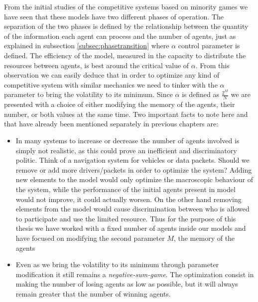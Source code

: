 From the initial studies of the competitive systems based on minority games we have seen that these models have two different phases of operation.
The separation of the two phases is defined by the relationship between the quantity of the information each agent can process and the number of agents, just as explained in subsection \ref{subsec:phasetransition} where $\alpha$ control parameter is defined.
The efficiency of the model, measured in the capacity to distribute the resources between agents, is best around the critical value of $\alpha$.
From this observation we can easily deduce that in order to optimize any kind of competitive system with similar mechanics we need to tinker with the $\alpha$ parameter to bring the volatility to its minimum.
Since $\alpha$ is defined as $\frac{2^M}{N}$ we are presented with a choice of either modifying the memory of the agents, their number, or both values at the same time.
Two important facts to note here and that have already been mentioned separately in previous chapters are: 
\begin{itemize}
\item In many systems to increase or decrease the number of agents involved is simply not realistic, as this could prove an inefficient and discriminatory politic. Think of a navigation system for vehicles or data packets. Should we remove or add more drivers/packets in order to optimize the system? Adding new elements to the model would only optimize the macroscopic behaviour of the system, while the performance of the initial agents present in model would not improve, it could actually worsen. On the other hand removing elements from the model would cause discrimination between who is allowed to participate and use the limited resource. Thus for the purpose of this thesis we have worked with a fixed number of agents inside our models and have focused on modifying the second parameter $M$, the memory of the agents
\item Even as we bring the volatility to its minimum through parameter modification it still remains a \textit{negative-sum-game}. The optimization consist in making the number of losing agents as low as possible, but it will always remain greater that the number of winning agents.
\end{itemize}

